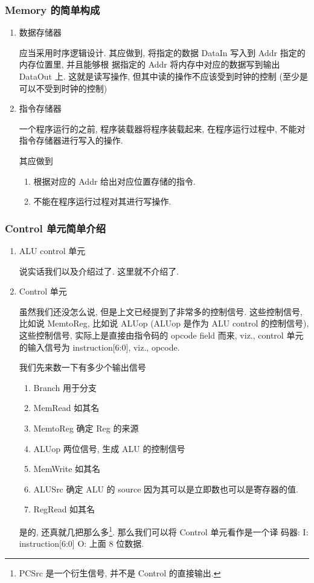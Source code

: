 \documentclass[11pt]{ctexart}
\begin{document}
\subsubsection{Memory 的简单构成}
\label{sec:org8af6ed2}
\begin{enumerate}
\item 数据存储器
\label{sec:org5c3d388}

应当采用时序逻辑设计. 
其应做到, 将指定的数据 DataIn 写入到 Addr 指定的内存位置里, 并且能够根
据指定的 Addr 将内存中对应的数据写到输出 DataOut 上. 这就是读写操作,
但其中读的操作不应该受到时钟的控制 (至少是可以不受到时钟的控制) 

\item 指令存储器
\label{sec:org37ac6f4}

一个程序运行的之前, 程序装载器将程序装载起来, 在程序运行过程中, 不能对
指令存储器进行写入的操作. 

其应做到
\begin{enumerate}
\item 根据对应的 Addr 给出对应位置存储的指令.
\item 不能在程序运行过程对其进行写操作.
\end{enumerate}
\end{enumerate}


\subsubsection{Control 单元简单介绍}
\label{sec:org4ac250f}
\begin{enumerate}
\item ALU control 单元
\label{sec:org5155788}

说实话我们以及介绍过了. 这里就不介绍了. 

\item Control 单元
\label{sec:orgd7b6fb1}

虽然我们还没怎么说, 但是上文已经提到了非常多的控制信号. 这些控制信号,
比如说 MemtoReg, 比如说 ALUop (ALUop 是作为 ALU control 的控制信号),
这些控制信号, 实际上是直接由指令码的 opcode field 而来, viz., control
单元的输入信号为 instruction[6:0], viz., opcode. 

我们先来数一下有多少个输出信号

\begin{enumerate}
\item Branch 用于分支
\item MemRead 如其名
\item MemtoReg 确定 Reg 的来源
\item ALUop 两位信号, 生成 ALU 的控制信号
\item MemWrite 如其名
\item ALUSrc 确定 ALU 的 source 因为其可以是立即数也可以是寄存器的值.
\item RegRead 如其名
\end{enumerate}

是的, 还真就几把那么多\footnote{PCSrc 是一个衍生信号, 并不是 Control 的直接输出.}. 那么我们可以将 Control 单元看作是一个译
码器:
    I: instruction[6:0]
    O: 上面 8 位数据.
\end{enumerate}
\end{document}
